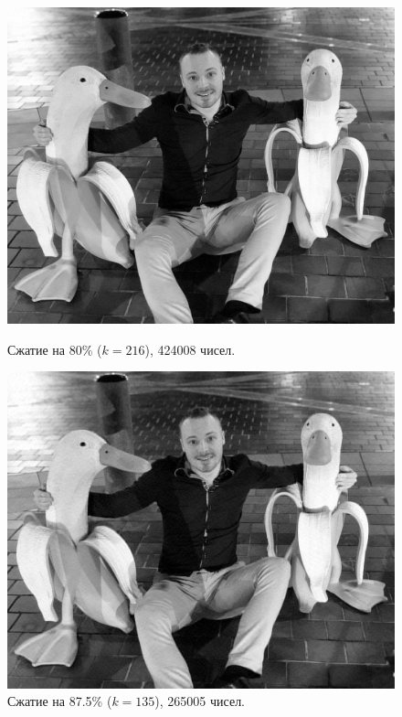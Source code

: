 \documentclass[a3paper,14pt]{extarticle}
\begin{document}
\begin{figure}[H]
    \begin{minipage}{0.45\textwidth}
        \centering\includegraphics[width=\textwidth]{banana ducks_216.jpg}
        \caption{Сжатие на 80\% ($k=216$), 424008 чисел.}
    \end{minipage}\hfill
    \begin{minipage}{0.45\textwidth}
        \centering\includegraphics[width=\textwidth]{banana ducks_135.jpg}
        \caption{Сжатие на 87.5\% ($k=135$), 265005 чисел.}
    \end{minipage}
\end{figure}
\end{document}
